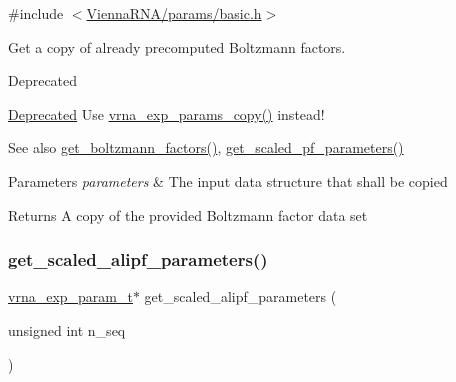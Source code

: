 {\ttfamily \#include $<$\mbox{\hyperlink{params_2basic_8h}{Vienna\+R\+N\+A/params/basic.\+h}}$>$}



Get a copy of already precomputed Boltzmann factors. 

\begin{DoxyRefDesc}{Deprecated}
\item[\mbox{\hyperlink{deprecated__deprecated000144}{Deprecated}}]Use \mbox{\hyperlink{group__energy__parameters_ga70bc46be7cfa5434a71efe241c4f0609}{vrna\+\_\+exp\+\_\+params\+\_\+copy()}} instead!\end{DoxyRefDesc}


\begin{DoxySeeAlso}{See also}
\mbox{\hyperlink{group__energy__parameters_gaef2b931c7e9d4ffb0a5c33df50ec2068}{get\+\_\+boltzmann\+\_\+factors()}}, \mbox{\hyperlink{group__energy__parameters_gabf3b9271c41dd3fac02d56e0b02b3344}{get\+\_\+scaled\+\_\+pf\+\_\+parameters()}}
\end{DoxySeeAlso}

\begin{DoxyParams}{Parameters}
{\em parameters} & The input data structure that shall be copied \\
\hline
\end{DoxyParams}
\begin{DoxyReturn}{Returns}
A copy of the provided Boltzmann factor data set 
\end{DoxyReturn}
\mbox{\label{group__energy__parameters_ga0ccf4e1be085a573533fd6b9da2d8cf9}} 
\subsubsection{\texorpdfstring{get\_scaled\_alipf\_parameters()}{get\_scaled\_alipf\_parameters()}}
{\footnotesize\ttfamily \mbox{\hyperlink{group__energy__parameters_ga01d8b92fe734df8d79a6169482c7d8d8}{vrna\+\_\+exp\+\_\+param\+\_\+t}}$\ast$ get\+\_\+scaled\+\_\+alipf\+\_\+parameters (\begin{DoxyParamCaption}\item[{unsigned int}]{n\+\_\+seq }\end{DoxyParamCaption})}



